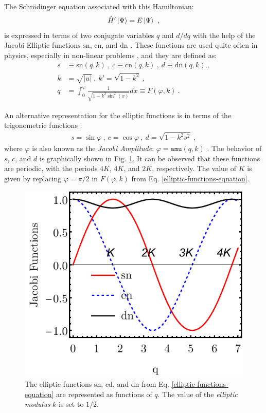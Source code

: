 The Schrödinger equation associated with this Hamiltonian:
\begin{align}
    \hat{H}'\ket{\Psi}=E\ket{\Psi}\ ,
\end{align}
is expressed in terms of two conjugate variables $q$ and $d/dq$ with the help of the Jacobi Elliptic functions $\text{sn}$, $\text{cn}$, and $\text{dn}$ \cite{jacobi1829fundamenta,akhiezer1990elements}. These functions are used quite often in physics, especially in non-linear problems \cite{kovacic2016jacobi}, and they are defined as:
\begin{align}
    s&\equiv\text{sn}(q,k)\ ,\ c\equiv\text{cn}(q,k)\ ,\ d\equiv\text{dn}(q,k)\ ,\nonumber\\
    k&=\sqrt{|u|}\ ,\ k'=\sqrt{1-k^2}\ ,\nonumber\\
    q&=\int_0^\varphi \frac{1}{\sqrt{1-k^2\sin^2(x)}}dx\equiv F(\varphi,k)\ .
    \label{elliptic-functions-equation}
\end{align}

An alternative representation for the elliptic functions is in terms of the trigonometric functions \cite{weisstein2002jacobi}:
\begin{align}
    s=\sin\varphi\ ,\ c=\cos\varphi\ ,\ d=\sqrt{1-k^2s^2}\ ,
\end{align}
where $\varphi$ is also known as the \emph{Jacobi Amplitude}: $\varphi=\texttt{amu}(q,k)$ \cite{weisstein2002jacobiamu}. The behavior of $s$, $c$, and $d$ is graphically shown in Fig. \ref{elliptic-functions-plot}. It can be observed that these functions are periodic, with the periods $4K$, $4K$, and $2K$, respectively. The value of $K$ is given by replacing $\varphi=\pi/2$ in $F(\varphi,k)$ from Eq. \ref{elliptic-functions-equation}.
\begin{figure}
    \centering
    \includegraphics[scale=0.9]{Chapters/Figures/Jacobi-Elliptic-Functions.pdf}
    \caption{The elliptic functions sn, cd, and dn from Eq. \ref{elliptic-functions-equation} are represented as functions of $q$. The value of the \emph{elliptic modulus} $k$ is set to $1/2$.}
    \label{elliptic-functions-plot}
\end{figure}

